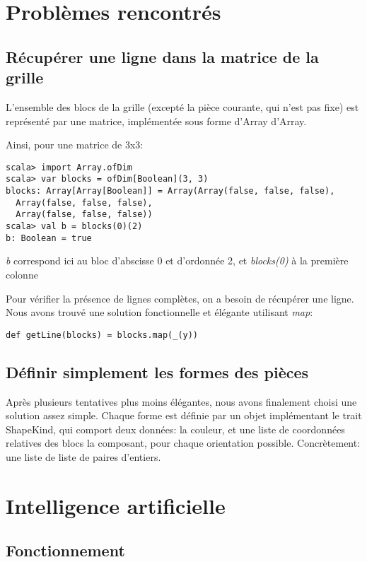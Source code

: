 \documentclass[11pt]{article}
\begin{document}
\section{Problèmes rencontrés}
\label{sec-4}

\subsection{Récupérer une ligne dans la matrice de la grille}
\label{sec-4-1}

L'ensemble des blocs de la grille (excepté la pièce courante, qui n'est pas fixe) est représenté par une matrice, implémentée sous forme d'Array d'Array.

Ainsi, pour une matrice de 3x3:

\begin{verbatim}
scala> import Array.ofDim
scala> var blocks = ofDim[Boolean](3, 3)
blocks: Array[Array[Boolean]] = Array(Array(false, false, false),
  Array(false, false, false),
  Array(false, false, false))
scala> val b = blocks(0)(2)
b: Boolean = true
\end{verbatim}

\emph{b} correspond ici au bloc d'abscisse 0 et d'ordonnée 2, et \emph{blocks(0)} à la première colonne

Pour vérifier la présence de lignes complètes, on a besoin de récupérer une ligne. Nous avons trouvé une solution fonctionnelle et élégante utilisant \emph{map}:

\begin{verbatim}
def getLine(blocks) = blocks.map(_(y))
\end{verbatim}
\subsection{Définir simplement les formes des pièces}
\label{sec-4-2}

Après plusieurs tentatives plus moins élégantes, nous avons finalement
choisi une solution assez simple. Chaque forme est définie par un
objet implémentant le trait ShapeKind, qui comport deux données: la
couleur, et une liste de coordonnées relatives des blocs la composant,
pour chaque orientation possible. Concrètement: une liste de liste de
paires d'entiers.

\section{Intelligence artificielle}

\subsection{Fonctionnement}
\end{document}
